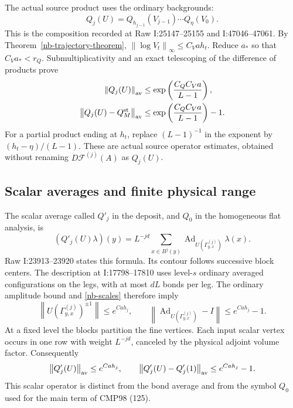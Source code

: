 \documentclass[11pt]{article}
\theoremstyle{remark}
\newcommand{\norm}[1]{\left\|#1\right\|}
\begin{document}
The actual source product uses the ordinary backgrounds:
\begin{equation}\label{nb-actual-product}
 Q_j(U)=Q_{h_{j-1}}(V_{j-1})\cdots Q_\eta(V_0).
\end{equation}
This is the composition recorded at Raw I:25147--25155 and
I:47046--47061. By Theorem~\ref{nb-trajectory-theorem},
$\norm{\log V_t}_\infty\le C_Vah_t$. Reduce $a_*$ so that
$C_Va_*<r_Q$. Submultiplicativity and an exact telescoping
of the difference of products prove
\begin{align}
 \norm{Q_j(U)}_{\rm av}
       &\le\exp\left(\frac{C_QC_Va}{L-1}\right),
                                      \label{nb-product-bound}\\
 \norm{Q_j(U)-Q_M^{\rm st}}_{\rm av}
       &\le\exp\left(\frac{C_QC_Va}{L-1}\right)-1.
                                      \label{nb-product-difference}
\end{align}
For a partial product ending at $h_t$, replace $(L-1)^{-1}$
in the exponent by $(h_t-\eta)/(L-1)$. These are actual source
operator estimates, obtained without renaming
$D\mathcal F^{(j)}(A)$ as $Q_j(U)$.

\subsection{Scalar averages and finite physical range}

The scalar average called $Q'_j$ in the deposit, and $Q_0$
in the homogeneous flat analysis, is
\begin{equation}\label{nb-scalar-average}
 (Q'_j(U)\lambda)(y)=L^{-jd}\sum_{x\in B^j(y)}
       \operatorname{Ad}_{U(\Gamma^{(j)}_{y,x})}\lambda(x).
\end{equation}
Raw I:23913--23920 states this formula. Its contour follows
successive block centers. The description at I:17798--17810
uses level-$s$ ordinary averaged configurations on the legs,
with at most $dL$ bonds per leg. The ordinary amplitude bound
and \eqref{nb-scales} therefore imply
\begin{equation}\label{nb-scalar-transport}
 \norm{U(\Gamma^{(j)}_{y,x})^{\pm1}}\le e^{Cah_j},
 \qquad
 \norm{\operatorname{Ad}_{U(\Gamma^{(j)}_{y,x})}-I}
                                      \le e^{Cah_j}-1.
\end{equation}
At a fixed level the blocks partition the fine vertices.
Each input scalar vertex occurs in one row with weight
$L^{-jd}$, canceled by the physical adjoint volume factor.
Consequently
\begin{equation}\label{nb-scalar-difference}
 \norm{Q'_j(U)}_{\rm av}\le e^{Cah_j},\qquad
 \norm{Q'_j(U)-Q'_j(1)}_{\rm av}\le e^{Cah_j}-1.
\end{equation}
This scalar operator is distinct from the bond average and
from the symbol $Q_0$ used for the main term of CMP98 (125).
\end{document}
